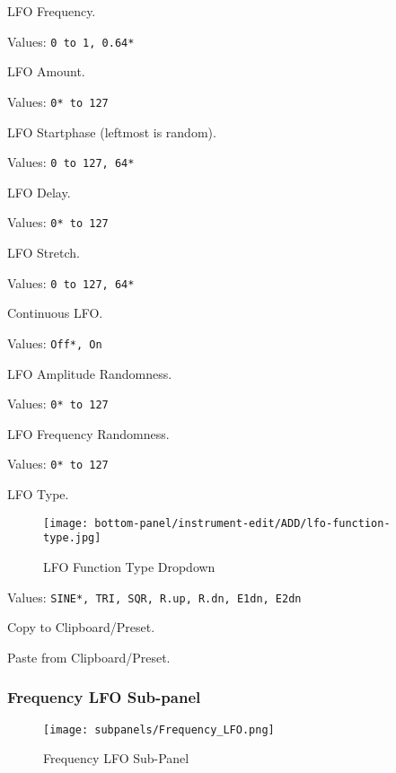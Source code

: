    LFO Frequency.

   Values: \texttt{0 to 1, 0.64*}

   LFO Amount.

   Values: \texttt{0* to 127}

   LFO Startphase (leftmost is random).

   Values: \texttt{0 to 127, 64*}

   LFO Delay.

   Values: \texttt{0* to 127}

   LFO Stretch.

   Values: \texttt{0 to 127, 64*}

   Continuous LFO.

   Values: \texttt{Off*, On}

   LFO Amplitude Randomness.

   Values: \texttt{0* to 127}

   LFO Frequency Randomness.

   Values: \texttt{0* to 127}

   LFO Type.

\begin{figure}[H]
   \centering 
   \texttt{[image: bottom-panel/instrument-edit/ADD/lfo-function-type.jpg]}
   \caption[LFO Function Types]{LFO Function Type Dropdown}
   \label{fig:frequency_lfo_dropdown}
\end{figure}

   Values: \texttt{SINE*, TRI, SQR, R.up, R.dn, E1dn, E2dn}

   Copy to Clipboard/Preset.

   Paste from Clipboard/Preset.

\subsubsection{Frequency LFO Sub-panel}
\label{subsubsec:frequency_lfo_sub_panel}

\begin{figure}[H]
   \centering 
   \texttt{[image: subpanels/Frequency\_LFO.png]}
   \caption[Frequency LFO Sub-Panel]{Frequency LFO Sub-Panel}
   \label{fig:frequency_lfo_subpanel}
\end{figure}

